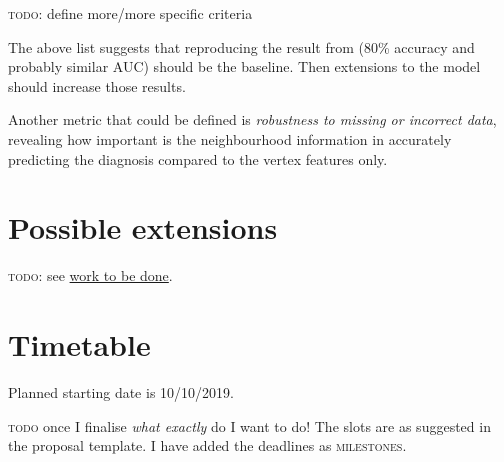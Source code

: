 \documentclass[12pt,a4paper,twoside]{article}
\begin{document}
\textsc{todo}: define more/more specific criteria

The above list suggests that reproducing the result from \cite{parisot2018disease} (80\% accuracy and probably similar AUC) should be the baseline. Then extensions to the model should increase those results.

Another metric that could be defined is \textit{robustness to missing or incorrect data}, revealing how important is the neighbourhood information in accurately predicting the diagnosis compared to the vertex features only.

\section*{Possible extensions}



\textsc{todo}: see \hyperref[section:work]{work to be done}.

\section*{Timetable}
\label{section:timetable}


Planned starting date is 10/10/2019.

\textsc{todo} once I finalise \textit{what exactly} do I want to do! The slots are as suggested in the proposal template. I have added the deadlines as \textsc{milestones}.
\end{document}
